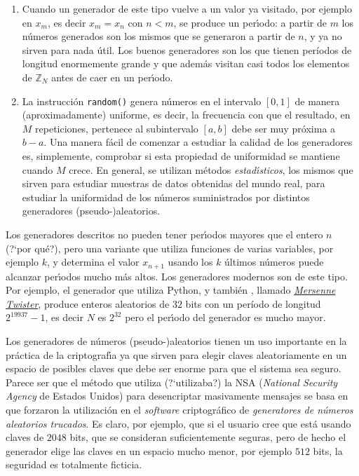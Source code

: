 \begin{enumerate}

\item Cuando un generador de este tipo  vuelve a un valor ya visitado, por
ejemplo en $x_{m}$, es decir $x_{m}=x_{n}$ con $n<m$,  se produce un
per\'{\i}odo: a partir de $m$ los n\'umeros generados son los mismos que se
generaron a partir de $n$, y ya no sirven para nada \'util. Los buenos
generadores son los que tienen períodos de longitud enormemente grande y que
adem\'as visitan casi todos los elementos de $\mathbb{Z}_N$ antes de caer en un
per\'{\i}odo.

\item La instrucción \lstinline|random()| genera n\'umeros en el intervalo
$[0,1]$ de manera (aproximadamente) uniforme, es decir,  la frecuencia con que
el resultado, en $M$ repeticiones, pertenece al subintervalo $[a,b]$ debe ser 
muy pr\'oxima a $b-a$. Una manera f\'acil de comenzar a estudiar la calidad de 
los
generadores es, simplemente, comprobar si esta propiedad de uniformidad se
mantiene cuando $M$ crece. En general, se utilizan m\'etodos {\itshape
estad\'{\i}sticos}, los mismos que sirven para estudiar muestras de datos
obtenidas del mundo real, para estudiar la uniformidad de los n\'umeros
suministrados por distintos generadores (pseudo-)aleatorios.

\end{enumerate}


Los generadores descritos no pueden tener per\'{\i}odos mayores que el entero
$n$ (?`por qu\'e?), pero una variante que utiliza funciones de varias variables,
por ejemplo
$k$,  y determina el valor $x_{n+1}$ usando los $k$ \'ultimos n\'umeros
puede alcanzar per\'{\i}odos mucho m\'as altos. Los generadores modernos son de
este tipo. Por ejemplo, el generador que utiliza Python, y tambi\'en {\sage},
llamado \href{http://en.wikipedia.org/wiki/Mersenne_twister}{\itshape Mersenne
Twister}, produce enteros aleatorios de $32$ bits con un período  de longitud
$2^{19937}-1$, es decir $N$ es $2^{32}$ pero el per\'{\i}odo del generador es
mucho mayor.
\label{nsa}

Los generadores de n\'umeros (pseudo-)aleatorios tienen un uso importante en la
pr\'actica de la criptograf\'{\i}a ya que  sirven para elegir claves
aleatoriamente en un espacio de posibles claves que debe ser enorme para que el
sistema sea seguro. Parece ser que el m\'etodo que utiliza (?`utilizaba?) la NSA
({\itshape National Security Agency} de Estados Unidos) para desencriptar
masivamente mensajes se basa en que forzaron la utilizaci\'on en el {\itshape
software} criptogr\'afico de {\itshape generatores de n\'umeros aleatorios 
trucados}. Es claro, por ejemplo,  que si el usuario cree que est\'a usando 
claves de
$2048$ bits, que se consideran suficientemente seguras, pero de hecho el
generador elige las claves en un espacio mucho menor, por ejemplo $512$ bits, la
seguridad es totalmente ficticia. 

